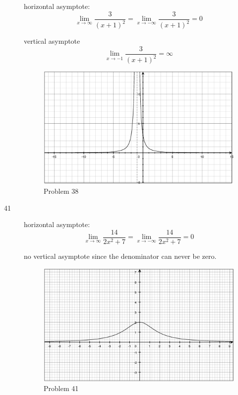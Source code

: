 \documentclass[fleqn]{exam}
\begin{document}
\begin{description}
horizontal asymptote:
\[
  \lim_{x \to \infty} \frac{3}{(x + 1)^2} = \lim_{x \to -\infty} \frac{3}{(x + 1)^2} = 0
\]

vertical asymptote
\[
  \lim_{x \to -1} \frac{3}{(x + 1)^2} = \infty
\]

\begin{figure}[H]
  \centering
  \includegraphics[scale=.3]{problem_38.eps}
  \caption*{Problem 38}
\end{figure}

\pagebreak

\item[41]

horizontal asymptote:
\[
  \lim_{x \to \infty} \frac{14}{2x^2 + 7} = \lim_{x \to -\infty} \frac{14}{2x^2 + 7} = 0
\]

no vertical asymptote since the denominator can never be zero.



\begin{figure}[H]
  \centering
  \includegraphics[scale=.3]{problem_41.eps}
  \caption*{Problem 41}
\end{figure}


\end{description}
\end{document}
